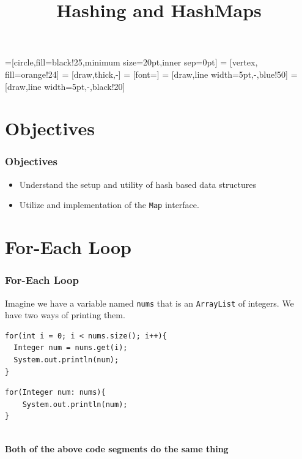 \documentclass{beamer}
\title{\textbf{Hashing and HashMaps}}
\date{\textbf{}}
\begin{document}

=[circle,fill=black!25,minimum size=20pt,inner sep=0pt]
 = [vertex, fill=orange!24]
 = [draw,thick,-]
 = [font=\small]
 = [draw,line width=5pt,-,blue!50]
 = [draw,line width=5pt,-,black!20]


\frame{\titlepage}

\section{Objectives}
\begin{frame}
    \frametitle{Objectives}
    \centering
    \begin{itemize}
        \item Understand the setup and utility of hash based data structures
        \item Utilize and implementation of the \lstinline|Map| interface.
    \end{itemize}
\end{frame}

\section{For-Each Loop}
\begin{frame}[fragile]
    \frametitle{For-Each Loop}
Imagine we have a variable named \lstinline|nums| that is an \lstinline|ArrayList| of integers. We have two ways of printing them.\\
    \vfill
    \begin{minipage}{0.56\textwidth}
    \begin{lstlisting}[frame=trBL, basicstyle=\scriptsize]
for(int i = 0; i < nums.size(); i++){
  Integer num = nums.get(i);
  System.out.println(num);
}
    \end{lstlisting}
    \end{minipage}
    \hfill
    \begin{minipage}{0.4\textwidth}
    \begin{lstlisting}[frame=trBL, basicstyle=\scriptsize]
for(Integer num: nums){
    System.out.println(num);    
}
    \end{lstlisting}
    \end{minipage}
    \vfill
    \\\textbf{Both of the above code segments do the same thing}
\end{frame}
\end{document}
